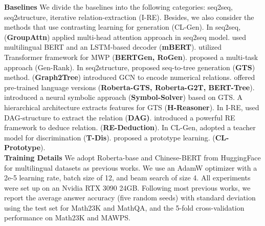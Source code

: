 \documentclass[11pt]{article}
\begin{document}
\indent \textbf{Baselines} We divide the baselines into the following categories: seq2seq, seq2structure, iterative relation-extraction (I-RE). Besides, we also consider the methods that use contrasting learning for generation (CL-Gen). In seq2seq, \citet{li-etal-2019-modeling} (\textbf{GroupAttn}) applied multi-head attention approach in seq2seq model. \citet{tan2021investigating} used multilingual BERT and an LSTM-based decoder (\textbf{mBERT}). \citet{lan2021mwptoolkit} utilized Transformer framework for MWP (\textbf{BERTGen, RoGen}). \citet{shen-etal-2021-generate-rank} proposed a multi-task approach (Gen-Rank). In seq2structure, \citet{xie2019goal} proposed seq-to-tree generation (\textbf{GTS}) method. \citet{zhang2020graph} (\textbf{Graph2Tree}) introduced GCN to encode numerical relations. \citet{patel-etal-2021-nlp,liang2021mwp} offered pre-trained language versions  (\textbf{Roberta-GTS, Roberta-G2T, BERT-Tree}). \citet{qin-etal-2021-neural} introduced a neural symbolic approach (\textbf{Symbol-Solver}) based on GTS. A hierarchical architecture extracts features for GTS \citep{yu-etal-2021-improving} (\textbf{H-Reasoner}). In I-RE, \citet{cao2021bottom} used DAG-structure to extract the relation (\textbf{DAG)}. \citet{jie2022learning} introduced a powerful RE framework to deduce relation. (\textbf{RE-Deduction}). In CL-Gen, \citet{ijcai2021-485} adopted a teacher model for discrimination (\textbf{T-Dis}). \citet{li2021seeking} proposed a prototype learning. (\textbf{CL-Prototype}).\\
\indent \textbf{Training Details} We adopt Roberta-base and Chinese-BERT from HuggingFace \citep{wolf-etal-2020-transformers} for multilingual datasets as previous works. We use an AdamW optimizer \citep{kingma2014adam,loshchilov2018decoupled} with a 2e-5 learning rate, batch size of 12, and beam search of size 4. All experiments were set up on an Nvidia RTX 3090 24GB. Following most previous works, we report the average answer accuracy (five random seeds) with standard deviation using the test set for Math23K and MathQA, and the 5-fold cross-validation performance on Math23K and MAWPS.
\end{document}
